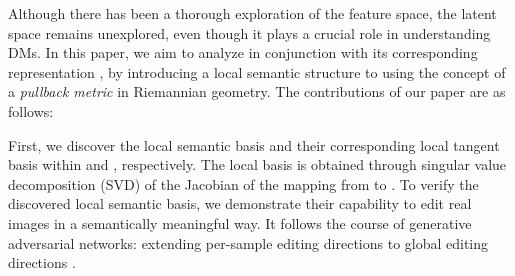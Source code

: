 Although there has been a thorough exploration of the feature space, the latent space \exspace{} remains unexplored, even though it plays a crucial role in understanding DMs.
In this paper, we aim to analyze \exspace{} in conjunction with its corresponding representation \ehspace{}, by introducing a local semantic structure to \exspace{} using the concept of a {\it pullback metric} in Riemannian geometry. 
The contributions of our paper are as follows: 




First, we discover the local semantic basis and their corresponding local tangent basis within \exspace{} and \ehspace{}, respectively. 
The local basis is obtained through singular value decomposition (SVD) of the Jacobian of the mapping from \exspace{} to \ehspace{}.
To verify the discovered local semantic basis, we demonstrate their capability to edit real images in a semantically meaningful way. 
 It follows the course of generative adversarial networks: extending per-sample editing directions \cite{ramesh2018spectral,patashnik2021styleclip,abdal2021styleflow,shen2021closed} to global editing directions \cite{harkonen2020ganspace,shen2021closed,yuksel2021latentclr}.

